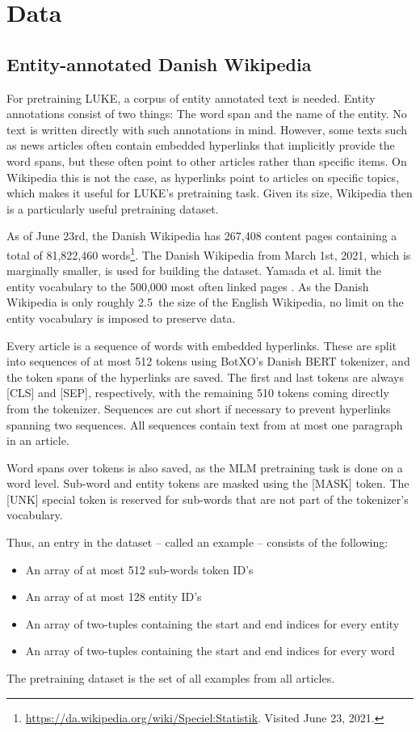 \documentclass[main.tex]{subfiles}
\begin{document}
\chapter{Data}
\label{chap:data}

\section{Entity-annotated Danish Wikipedia}
\label{sec:dawiki}
For pretraining LUKE, a corpus of entity annotated text is needed.
Entity annotations consist of two things: The word span and the name of the entity.
No text is written directly with such annotations in mind.
However, some texts such as news articles often contain embedded hyperlinks that implicitly provide the word spans, but these often point to other articles rather than specific items.
On Wikipedia this is not the case, as hyperlinks point to articles on specific topics, which makes it useful for LUKE's pretraining task.
Given its size, Wikipedia then is a particularly useful pretraining dataset.

As of June 23rd, the Danish Wikipedia has 267,408 content pages containing a total of 81,822,460 words\footnote{\url{https://da.wikipedia.org/wiki/Speciel:Statistik}. Visited June 23, 2021.}.
The Danish Wikipedia from March 1st, 2021, which is marginally smaller, is used for building the dataset.
Yamada et al. limit the entity vocabulary to the 500,000 most often linked pages \cite{yamada2020luke}.
As the Danish Wikipedia is only roughly 2.5\pro\ the size of the English Wikipedia, no limit on the entity vocabulary is imposed to preserve data.

Every article is a sequence of words with embedded hyperlinks.
These are split into sequences of at most 512 tokens using BotXO's Danish BERT tokenizer, and the token spans of the hyperlinks are saved.
The first and last tokens are always [CLS] and [SEP], respectively, with the remaining 510 tokens coming directly from the tokenizer.
Sequences are cut short if necessary to prevent hyperlinks spanning two sequences.
All sequences contain text from at most one paragraph in an article.

Word spans over tokens is also saved, as the MLM pretraining task is done on a word level.
Sub-word and entity tokens are masked using the [MASK] token.
The [UNK] special token is reserved for sub-words that are not part of the tokenizer's vocabulary.

Thus, an entry in the dataset -- called an example -- consists of the following:
\begin{itemize}
    \item An array of at most 512 sub-words token ID's
    \item An array of at most 128 entity ID's
    \item An array of two-tuples containing the start and end indices for every entity
    \item An array of two-tuples containing the start and end indices for every word
\end{itemize}
The pretraining dataset is the set of all examples from all articles.
\end{document}
